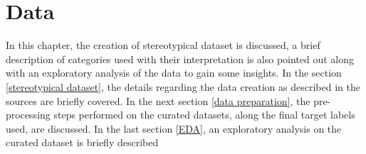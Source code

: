 \chapter{Data}

In this chapter, the creation of stereotypical dataset is discussed, a brief description of   categories used with their interpretation is also pointed out along with an exploratory analysis of the data to gain some insights. In the section \ref{stereotypical dataset}, the details regarding the data creation as described in the sources are briefly covered. In the next section \ref{data preparation}, the pre-processing steps performed on the curated datasets, along the final target labels used, are discussed. In the last section \ref{EDA}, an exploratory analysis on the curated dataset is briefly described

